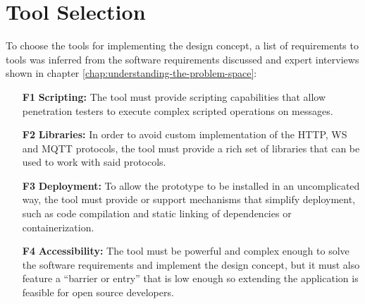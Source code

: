 \section{Tool Selection}
\label{sec:tool-selection}
To choose the tools for implementing the design concept, a list of requirements to tools was inferred from the software requirements discussed and expert interviews shown in chapter \ref{chap:understanding-the-problem-space}:
\begin{itemize}
    \item [\textbf{F1}] \textbf{Scripting:} The tool must provide scripting capabilities that allow penetration testers to execute complex scripted operations on messages.
    \item [\textbf{F2}] \textbf{Libraries:} In order to avoid custom implementation of the \ac{HTTP}, \ac{WS} and \ac{MQTT} protocols, the tool must provide a rich set of libraries that can be used to work with said protocols.
    \item [\textbf{F3}] \textbf{Deployment:} To allow the prototype to be installed in an uncomplicated way, the tool must provide or support mechanisms that simplify deployment, such as code compilation and static linking of dependencies or containerization.
    \item [\textbf{F4}] \textbf{Accessibility:} The tool must be powerful and complex enough to solve the software requirements and implement the design concept, but it must also feature a \enquote{barrier or entry} that is low enough so extending the application is feasible for open source developers.
\end{itemize}

